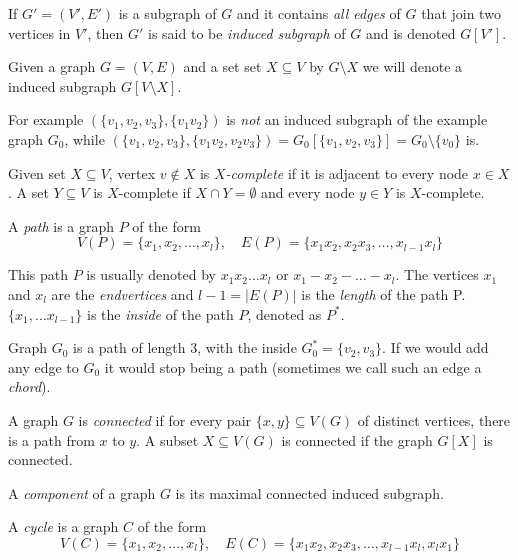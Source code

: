 \begin{defn}
  If $G' = (V', E')$ is a subgraph of $G$ and it contains \emph{all edges} of $G$ that join two vertices in $V'$, then $G'$ is said to be \emph{induced subgraph} of $G$ and is denoted $G[V']$.
\end{defn}

Given a graph $G = (V, E)$ and a set set $X \subseteq V$ by $G\setminus X$ we will denote a induced subgraph $G[V\setminus X]$.

For example $(\{v_1, v_2, v_3\}, \{v_1v_2\})$ is \emph{not} an induced subgraph of the example graph $G_0$, while $(\{v_1, v_2, v_3\}, \{v_1v_2, v_2v_3\}) = G_0[\{v_1, v_2, v_3\}] = G_0 \setminus \{v_0\}$ is.

\begin{defn}[$X$-completeness]
  Given set $X \subseteq V$, vertex $v \notin X$ is \emph{$X$-complete} if it is adjacent to every node $x \in X$. A set $Y \subseteq V$ is $X$-complete if $X \cap Y = \emptyset$ and every node $y \in Y$ is $X$-complete.
\end{defn}

\begin{defn}[path]
  A \emph{path} is a graph $P$ of the form
  \[ V(P) = \{x_1, x_2, \ldots, x_l\},\quad E(P) = \{x_1x_2, x_2x_3, \ldots, x_{l-1}x_l\} \]
\end{defn}
This path $P$ is usually denoted by $x_1x_2\ldots x_l$ or $x_1 - x_2 - \ldots - x_l$. The vertices $x_1$ and $x_l$ are the \emph{endvertices} and ${l-1} = |E(P)|$ is the \emph{length} of the path P. $\{x_1, \ldots x_{l-1}\}$ is the \emph{inside} of the path $P$, denoted as $P^*$.

Graph $G_0$ is a path of length 3, with the inside $G_0^* = \{v_2, v_3\}$. If we would add any edge to $G_0$ it would stop being a path (sometimes we call such an edge a \emph{chord}).


\begin{defn}
  A graph $G$ is \emph{connected} if for every pair $\{x, y\} \subseteq V(G)$ of distinct vertices, there is a path from $x$ to $y$. 
  A subset $X \subseteq V(G)$ is connected if the graph $G[X]$ is connected.
\end{defn}

\begin{defn}[component]
  A \emph{component} of a graph $G$ is its maximal connected induced subgraph.
\end{defn}


\begin{defn}[cycle]
  A \emph{cycle} is a graph $C$ of the form
  \[ V(C) = \{x_1, x_2, \ldots, x_l\},\quad E(C) = \{x_1x_2, x_2x_3, \ldots, x_{l-1}x_l, x_lx_1\} \]
\end{defn}

